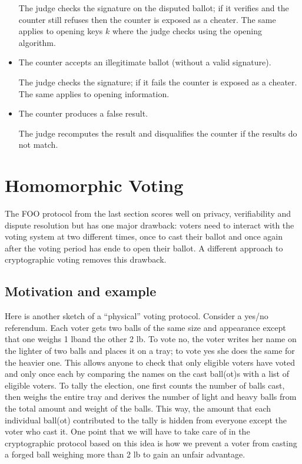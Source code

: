 \documentclass[envcountsame]{llncs}
\begin{document}
\begin{itemize}
The judge checks the signature on the disputed ballot; if it verifies and the
counter still refuses then the counter is exposed as a cheater. The same applies
to opening keys $k$ where the judge checks using the opening algorithm.

\item The counter accepts an illegitimate ballot (without a valid signature).

The judge checks the signature; if it fails the counter is exposed as a cheater.
The same applies to opening information.

\item The counter produces a false result.

The judge recomputes the result and disqualifies the counter if the results do
not match.
\end{itemize}

\section{Homomorphic Voting}

The FOO protocol from the last section scores well on privacy, verifiability and
dispute resolution but has one major drawback: voters need to interact with the
voting system at two different times, once to cast their ballot and once again
after the voting period has ende to open their ballot. A different approach to
cryptographic voting removes this drawback.

\subsection{Motivation and example}

Here is another sketch of a ``physical'' voting protocol. Consider a yes/no
referendum. Each voter gets two balls of the same size and appearance except
that one weighs 1 lb\footnotemark and the other 2 lb. To vote no, the voter
writes her name on the lighter of two balls and places it on a tray; to vote yes
she does the same for the heavier one. This allows anyone to check that only
eligible voters have voted and only once each by comparing the names on the cast
ball(ot)s with a list of eligible voters. To tally the election, one first
counts the number of balls cast, then weighs the entire tray and derives the
number of light and heavy balls from the total amount and weight of the balls.
This way, the amount that each individual ball(ot) contributed to the tally is
hidden from everyone except the voter who cast it. One point that we will have
to take care of in the cryptographic protocol based on this idea is how we
prevent a voter from casting a forged ball weighing more than 2 lb to gain an
unfair advantage.
\end{document}
